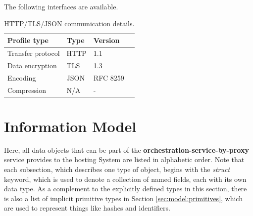 \documentclass[a4paper]{arrowhead}
\begin{document}
The following interfaces are available.


\begin{table}[ht!]
  \centering
  \begin{tabular}{|l|l|l|l|}
    \rowcolor{gray!33} Profile type & Type & Version \\ \hline
    Transfer protocol & HTTP & 1.1 \\ \hline
    Data encryption & TLS & 1.3 \\ \hline
    Encoding & JSON & RFC 8259 \cite{rfc8259} \\ \hline
    Compression & N/A & - \\ \hline
  \end{tabular}
  \caption{HTTP/TLS/JSON communication details.}
  \label{tab:comunication_semantics_profile}
\end{table}

\clearpage

\section{Information Model}
\label{sec:model}

Here, all data objects that can be part of the \textbf{orchestration-service-by-proxy} service
provides to the hosting System are listed in alphabetic order.
Note that each subsection, which describes one type of object, begins with the \textit{struct} keyword, which is used to denote a collection of named fields, each with its own data type.
As a complement to the explicitly defined types in this section, there is also a list of implicit primitive types in Section \ref{sec:model:primitives}, which are used to represent things like hashes and identifiers.

\label{sec:model:OrchestrationForm}
\end{document}
